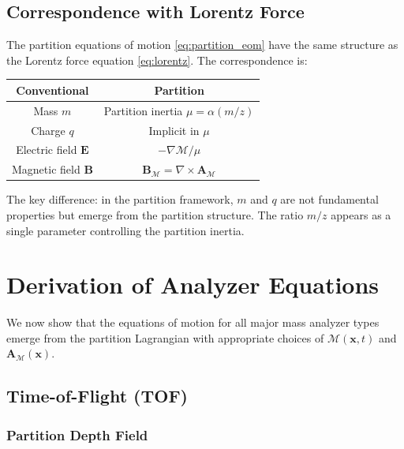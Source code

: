 \documentclass[twocolumn,10pt,a4paper]{article}
\theoremstyle{definition}
\theoremstyle{remark}
\newcommand{\Mdepth}{\mathcal{M}}
\newcommand{\Apartition}{\mathbf{A}_{\mathcal{M}}}
\newcommand{\partinert}{\mu}
\begin{document}
\subsection{Correspondence with Lorentz Force}

The partition equations of motion \eqref{eq:partition_eom} have the same structure as the Lorentz force equation \eqref{eq:lorentz}. The correspondence is:

\begin{center}
\begin{tabular}{cc}
\toprule
\textbf{Conventional} & \textbf{Partition} \\
\midrule
Mass $m$ & Partition inertia $\partinert = \alpha(m/z)$ \\
Charge $q$ & Implicit in $\partinert$ \\
Electric field $\mathbf{E}$ & $-\nabla\Mdepth/\partinert$ \\
Magnetic field $\mathbf{B}$ & $\mathbf{B}_{\Mdepth} = \nabla \times \Apartition$ \\
\bottomrule
\end{tabular}
\end{center}

The key difference: in the partition framework, $m$ and $q$ are not fundamental properties but emerge from the partition structure. The ratio $m/z$ appears as a single parameter controlling the partition inertia.



\section{Derivation of Analyzer Equations}
\label{sec:analyzers}

We now show that the equations of motion for all major mass analyzer types emerge from the partition Lagrangian with appropriate choices of $\Mdepth(\mathbf{x}, t)$ and $\Apartition(\mathbf{x})$.

\subsection{Time-of-Flight (TOF)}

\subsubsection{Partition Depth Field}
\end{document}

